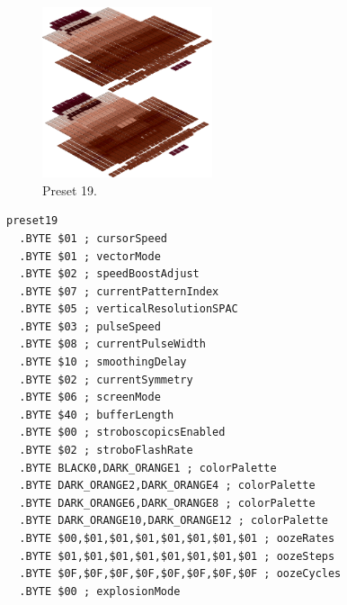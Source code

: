 \begin{minipage}[b]{0.48\linewidth}
\begin{figure}[H]                                                          
  \centering                                                             
  \begin{adjustbox}{width=5cm,center}                                   
  \includegraphics[width=5cm]{src/colorspace_presets/preset19-45.png}%
  \end{adjustbox}                                                        
\caption*{Preset 19.}                                           
\end{figure}                                                               
\end{minipage}
\hspace{0.1cm}
\begin{minipage}[b]{0.48\linewidth}                                       
\begin{lstlisting}[basicstyle=\ttfamily\tiny]
preset19
  .BYTE $01 ; cursorSpeed
  .BYTE $01 ; vectorMode
  .BYTE $02 ; speedBoostAdjust
  .BYTE $07 ; currentPatternIndex
  .BYTE $05 ; verticalResolutionSPAC
  .BYTE $03 ; pulseSpeed
  .BYTE $08 ; currentPulseWidth
  .BYTE $10 ; smoothingDelay
  .BYTE $02 ; currentSymmetry
  .BYTE $06 ; screenMode
  .BYTE $40 ; bufferLength
  .BYTE $00 ; stroboscopicsEnabled
  .BYTE $02 ; stroboFlashRate
  .BYTE BLACK0,DARK_ORANGE1 ; colorPalette
  .BYTE DARK_ORANGE2,DARK_ORANGE4 ; colorPalette
  .BYTE DARK_ORANGE6,DARK_ORANGE8 ; colorPalette
  .BYTE DARK_ORANGE10,DARK_ORANGE12 ; colorPalette
  .BYTE $00,$01,$01,$01,$01,$01,$01,$01 ; oozeRates
  .BYTE $01,$01,$01,$01,$01,$01,$01,$01 ; oozeSteps
  .BYTE $0F,$0F,$0F,$0F,$0F,$0F,$0F,$0F ; oozeCycles
  .BYTE $00 ; explosionMode
\end{lstlisting}
\end{minipage}


